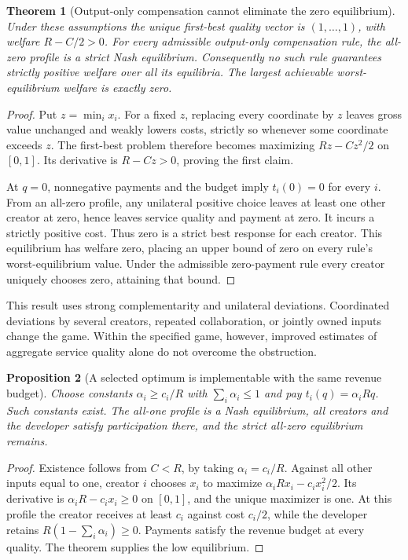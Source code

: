 \documentclass[11pt]{article}
\newtheorem{theorem}{Theorem}
\newtheorem{proposition}[theorem]{Proposition}
\theoremstyle{definition}
\begin{document}
\begin{theorem}[Output-only compensation cannot eliminate the zero equilibrium]
Under these assumptions the unique first-best quality vector is $(1,\ldots,1)$, with welfare $R-C/2>0$. For every admissible output-only compensation rule, the all-zero profile is a strict Nash equilibrium. Consequently no such rule guarantees strictly positive welfare over all its equilibria. The largest achievable worst-equilibrium welfare is exactly zero.
\end{theorem}
\begin{proof}
Put $z=\min_i x_i$. For a fixed $z$, replacing every coordinate by $z$ leaves gross value unchanged and weakly lowers costs, strictly so whenever some coordinate exceeds $z$. The first-best problem therefore becomes maximizing $Rz-Cz^2/2$ on $[0,1]$. Its derivative is $R-Cz>0$, proving the first claim.

At $q=0$, nonnegative payments and the budget imply $t_i(0)=0$ for every $i$. From an all-zero profile, any unilateral positive choice leaves at least one other creator at zero, hence leaves service quality and payment at zero. It incurs a strictly positive cost. Thus zero is a strict best response for each creator. This equilibrium has welfare zero, placing an upper bound of zero on every rule's worst-equilibrium value. Under the admissible zero-payment rule every creator uniquely chooses zero, attaining that bound.
\end{proof}

This result uses strong complementarity and unilateral deviations. Coordinated deviations by several creators, repeated collaboration, or jointly owned inputs change the game. Within the specified game, however, improved estimates of aggregate service quality alone do not overcome the obstruction.

\begin{proposition}[A selected optimum is implementable with the same revenue budget]
Choose constants $\alpha_i\geq c_i/R$ with $\sum_i\alpha_i\leq1$ and pay $t_i(q)=\alpha_iRq$. Such constants exist. The all-one profile is a Nash equilibrium, all creators and the developer satisfy participation there, and the strict all-zero equilibrium remains.
\end{proposition}
\begin{proof}
Existence follows from $C<R$, by taking $\alpha_i=c_i/R$. Against all other inputs equal to one, creator $i$ chooses $x_i$ to maximize $\alpha_iRx_i-c_ix_i^2/2$. Its derivative is $\alpha_iR-c_ix_i\geq0$ on $[0,1]$, and the unique maximizer is one. At this profile the creator receives at least $c_i$ against cost $c_i/2$, while the developer retains $R(1-\sum_i\alpha_i)\geq0$. Payments satisfy the revenue budget at every quality. The theorem supplies the low equilibrium.
\end{proof}
\end{document}

